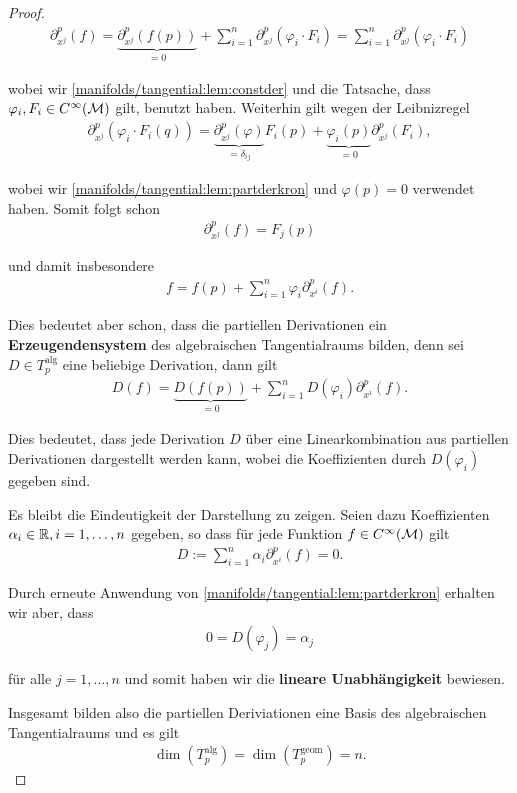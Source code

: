 \begin{proof}
\begin{align*}
\partial_{x^j}^p (f) = 
\underbrace{\partial_{x^j}^p (f(p))}_{=0} + 
\sum_{i=1}^{n} \partial_{x^j}^p(\varphi_i \cdot F_i) = 
\sum_{i=1}^{n} \partial_{x^j}^p(\varphi_i \cdot F_i)
\end{align*}
\par
wobei wir \cref{manifolds/tangential:lem:constder} und die Tatsache, dass \(\varphi_i, F_i\in C^\infty(\mathcal{M})\) gilt, benutzt haben.
Weiterhin gilt wegen der Leibnizregel
\begin{align*}
\partial_{x^j}^p(\varphi_i \cdot F_i(q)) = 
\underbrace{\partial_{x^j}^p(\varphi)}_{=\delta_{ij}} F_i(p)+ \underbrace{\varphi_i(p)}_{=0} \partial_{x^j}^p(F_i),
\end{align*}
\par
wobei wir \cref{manifolds/tangential:lem:partderkron} und \(\varphi(p)=0\) verwendet haben.
Somit folgt schon
\begin{align*}
\partial_{x^j}^p (f) = F_j(p)
\end{align*}
\par
und damit insbesondere
\begin{align*}
f = f(p) + \sum_{i=1}^{n} \varphi_i \partial_{x^i}^p(f).
\end{align*}
\par
Dies bedeutet aber schon, dass die partiellen Derivationen ein \textbf{Erzeugendensystem} des algebraischen Tangentialraums bilden, denn sei \(D\in T^{\text{alg}}_p\) eine beliebige Derivation, dann gilt
\begin{align*}
D(f) = \underbrace{D(f(p))}_{=0} + \sum_{i=1}^n D(\varphi_i) \partial_{x^i}^p(f).
\end{align*}
\par
Dies bedeutet, dass jede Derivation \(D\) über eine Linearkombination aus partiellen Derivationen dargestellt werden kann, wobei die Koeffizienten durch \(D(\varphi_i)\) gegeben sind.

\par
Es bleibt die Eindeutigkeit der Darstellung zu zeigen.
Seien dazu Koeffizienten \(\alpha_i \in \mathbb{R}, i=1,\ldots,n\) gegeben, so dass für jede Funktion \(f\in C^\infty(\mathcal{M})\) gilt
\begin{align*}
D:= \sum_{i=1}^n \alpha_i \partial_{x^i}^p(f) = 0.
\end{align*}
\par
Durch erneute Anwendung von \cref{manifolds/tangential:lem:partderkron} erhalten wir aber, dass
\begin{align*}
0 = D(\varphi_j) = \alpha_j\end{align*}
\par
für alle \(j=1,\ldots,n\) und somit haben wir die \textbf{lineare Unabhängigkeit} bewiesen.

\par
Insgesamt bilden also die partiellen Deriviationen eine Basis des algebraischen Tangentialraums und es gilt
\begin{align*}
\dim(T^{\text{alg}}_p)=\dim(T^{\text{geom}}_p)=n.
\end{align*}\end{proof}


